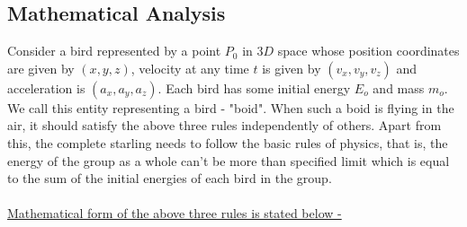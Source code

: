 \documentclass[a4paper]{article}
\begin{document}
\subsection{Mathematical Analysis}

Consider a bird represented by a point $P_{0}$ in $3D$ space whose position coordinates are given by $(x, y, z)$, velocity at any time $t$ is given by $(v_{x}, v_{y}, v_{z})$ and acceleration is $(a_{x}, a_{y}, a_{z})$. Each bird has some initial energy $E_{o}$ and mass $m_{o}$. We call this entity representing a bird - "boid". When such a boid is flying in the air, it should satisfy the above three rules independently of others. Apart from this, the complete starling needs to follow the basic rules of physics, that is, the energy of the group as a whole can't be more than specified limit which is equal to the sum of the initial energies of each bird in the group.
\\\\
\smallskip
\underline{Mathematical form of the above three rules is stated below - }
\smallskip
\end{document}
